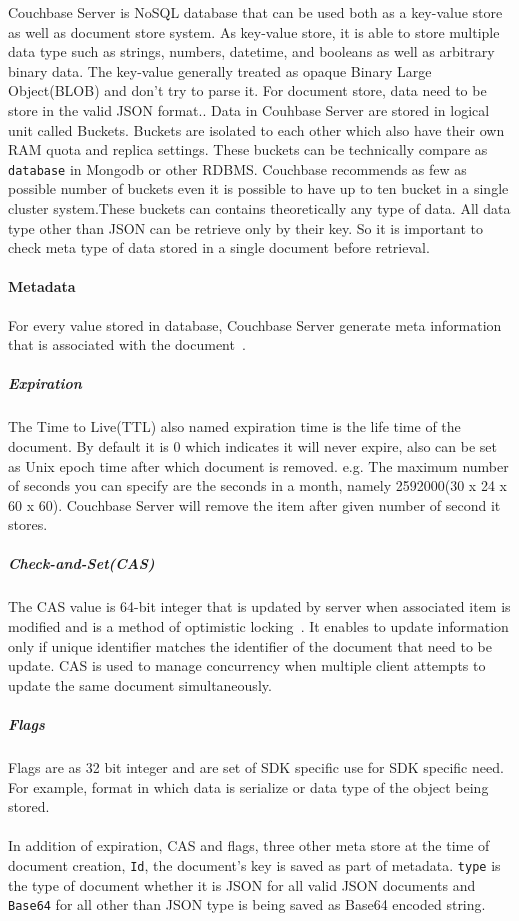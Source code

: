 Couchbase Server is NoSQL database that can be used both as a key-value store as well as document store system. As key-value store, it is able to store  multiple data type such as strings, numbers, datetime, and booleans as well as arbitrary binary data. The key-value generally treated as opaque Binary Large Object(BLOB) and don't try to parse it. For document store, data need to be store in the valid JSON format.. Data in Couhbase Server are stored in logical unit called Buckets. Buckets are isolated to each other which also have their own RAM quota and replica settings. These buckets can be technically compare as \texttt{database} in Mongodb or other RDBMS. Couchbase recommends as few as possible number of buckets even it is possible to have up to ten bucket in a single cluster system.These buckets can contains theoretically any type of data. All data type other than JSON can be retrieve only by their key. So it is important to check meta type of data stored in a single document before retrieval. 
\paragraph{Metadata}
For every value stored in database, Couchbase Server generate meta information that is associated with the document~\cite{cb/ostrovsky2014pro}. 
	\subparagraph{Expiration}
		The Time to Live(TTL) also named expiration time is the life time of the document. By default it is 0 which indicates it will never expire, also can be set as Unix epoch time after which document is removed. e.g. The maximum number of seconds you can specify are the seconds in a month, namely 2592000(30 x 24 x 60 x 60). Couchbase Server will remove the item after given number of second it stores. 
	\subparagraph{Check-and-Set(CAS)}
		The CAS value is 64-bit integer that is updated by server when associated item is modified and is a method of optimistic locking~\cite{halici1991optimistic}. It enables to update information only if unique identifier matches the identifier of the document that need to be update. CAS is used to manage concurrency when multiple client attempts to update the same document simultaneously. 
	\subparagraph{Flags} 
		Flags are  as 32 bit integer and are set of SDK specific use for SDK specific need. For example, format in which data is serialize or data type of the object being stored. 
	\\ 
	\\
In addition of expiration, CAS and flags, three other meta store at the time of document creation, \texttt{Id}, the document's key is saved as part of metadata. \texttt{type} is the type of document whether it is JSON for all valid JSON documents and \texttt{Base64} for all other than JSON type is being saved as Base64 encoded string.
